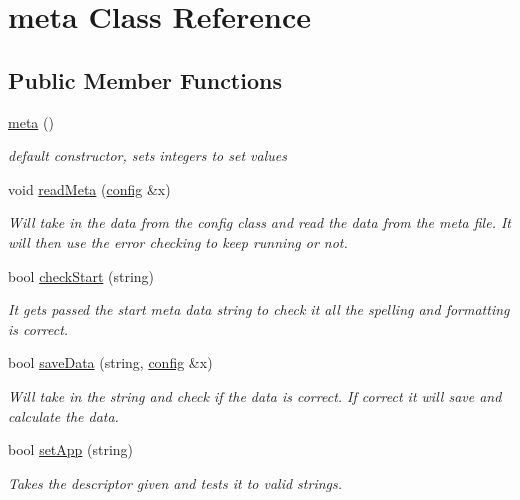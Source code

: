 \hypertarget{classmeta}{}\section{meta Class Reference}
\label{classmeta}
\subsection*{Public Member Functions}
\begin{DoxyCompactItemize}
\item 
\mbox{\label{classmeta_a63ad3379066eb6b7c8bf7a7ea9ee0783}} 
\mbox{\hyperlink{classmeta_a63ad3379066eb6b7c8bf7a7ea9ee0783}{meta}} ()
\begin{DoxyCompactList}\small\item\em default constructor, sets integers to set values \end{DoxyCompactList}\item 
void \mbox{\hyperlink{classmeta_ae9afbaec8f5d1850634923cb991a63ad}{read\+Meta}} (\mbox{\hyperlink{classconfig}{config}} \&x)
\begin{DoxyCompactList}\small\item\em Will take in the data from the config class and read the data from the meta file. It will then use the error checking to keep running or not. \end{DoxyCompactList}\item 
bool \mbox{\hyperlink{classmeta_aba0981f2594f4237707bd3c8b39eb132}{check\+Start}} (string)
\begin{DoxyCompactList}\small\item\em It gets passed the start meta data string to check it all the spelling and formatting is correct. \end{DoxyCompactList}\item 
bool \mbox{\hyperlink{classmeta_afecfa24d119f15e3be5e01f37769a180}{save\+Data}} (string, \mbox{\hyperlink{classconfig}{config}} \&x)
\begin{DoxyCompactList}\small\item\em Will take in the string and check if the data is correct. If correct it will save and calculate the data. \end{DoxyCompactList}\item 
bool \mbox{\hyperlink{classmeta_a63b659832069e195bb2013b63dd9b4e7}{set\+App}} (string)
\begin{DoxyCompactList}\small\item\em Takes the descriptor given and tests it to valid strings. \end{DoxyCompactList}\item 

\end{DoxyCompactItemize}
